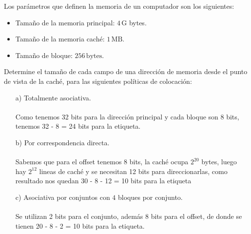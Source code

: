 \begin{ejercicio}
    Los parámetros que definen la memoria de un computador son los siguientes:
    \begin{itemize}
        \item Tamaño de la memoria principal: \(4 \, \text{G}\) bytes.
        \item Tamaño de la memoria caché: \(1 \, \text{MB}\).
        \item Tamaño de bloque: \(256 \, \text{bytes}\).
    \end{itemize}
    Determine el tamaño de cada campo de una dirección de memoria desde el punto de vista de la caché, para las siguientes políticas de colocación:
    \begin{itemize}
        \item[a)] Totalmente asociativa.
            \\ \\
            Como tenemos 32 bits para la dirección principal y cada bloque son 8 bits, tenemos 32 - 8 = 24 bits para la etiqueta.
        \item[b)] Por correspondencia directa.
            \\ \\
            Sabemos que para el offset tenemos 8 bits, la caché ocupa $2^{20}$ bytes, luego hay $2^{12}$ lineas de caché y se necesitan 12 bits para direccionarlas,
            como resultado nos quedan 30 - 8 - 12 = 10 bits para la etiqueta

        \item[c)] Asociativa por conjuntos con \(4\) bloques por conjunto.
            \\ \\
            Se utilizan 2 bits para el conjunto, además 8 bits para el offset, de donde se tienen 20 - 8 - 2 = 10 bits para la etiqueta.
    \end{itemize}
\end{ejercicio}

